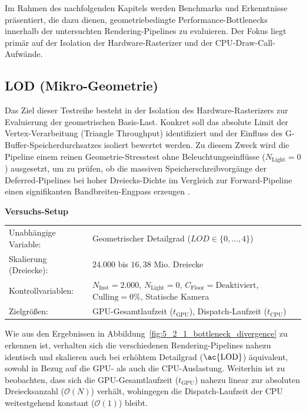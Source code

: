 Im Rahmen des nachfolgenden Kapitels werden Benchmarks und Erkenntnisse präsentiert, die dazu dienen, geometriebedingte
Performance-Bottlenecks innerhalb der untersuchten Rendering-Pipelines zu evaluieren.
Der Fokus liegt primär auf der Isolation der Hardware-Rasterizer und der \ac{CPU}-Draw-Call-Aufwände.

\subsection{{LOD (Mikro-Geometrie)}}
\label{subsec:050201_lod_eval}

Das Ziel dieser Testreihe besteht in der Isolation des Hardware-Rasterizers zur Evaluierung der geometrischen Basis-Last.
Konkret soll das absolute Limit der Vertex-Verarbeitung (Triangle Throughput) identifiziert und der Einfluss des
G-Buffer-Speicherdurchsatzes isoliert bewertet werden.
Zu diesem Zweck wird die Pipeline einem reinen Geometrie-Stresstest ohne Beleuchtungseinflüsse ($N_{\text{Light}} = 0$)
ausgesetzt, um zu prüfen, ob die massiven Speicherschreibvorgänge der Deferred-Pipelines bei hoher Dreiecks-Dichte im
Vergleich zur Forward-Pipeline einen signifikanten Bandbreiten-Engpass
erzeugen \cite[S.~55]{burnsVisibilityBufferCacheFriendly2013}.

\begin{center}
    \small
    \colorbox{gray!5}{\parbox{0.95\textwidth}{
        \centering
        \vspace{2mm}
        {\sffamily\bfseries Versuchs-Setup} \\[1.5ex]
        \begin{tabularx}{0.9\textwidth}{>{\sffamily}l X}
            Unabhängige Variable:    & Geometrischer Detailgrad ($LOD \in \{0, \dots, 4\}$) \\
            Skalierung (Dreiecke):   & $24.000$ bis $16{,}38\text{ Mio.}$ Dreiecke \\
            Kontrollvariablen:       & $N_{\text{Inst}} = 2.000$, $N_{\text{Light}} = 0$, $C_{\text{Floor}} =
            \text{Deaktiviert}$, $\text{Culling} = 0\%$, Statische Kamera \\
            Zielgrößen:              & \ac{GPU}-Gesamtlaufzeit ($t_{\text{GPU}}$), Dispatch-Laufzeit ($t_{\text{CPU}}$)
        \end{tabularx}
        \vspace{2mm}
    }}
\end{center}

Wie aus den Ergebnissen in Abbildung~\ref{fig:5_2_1_bottleneck_divergence} zu erkennen ist, verhalten sich die
verschiedenen Rendering-Pipelines nahezu identisch und skalieren auch bei erhöhtem Detailgrad ($\text{\ac{LOD}}$)
äquivalent, sowohl in Bezug auf die \ac{GPU}- als auch die \ac{CPU}-Auslastung.
Weiterhin ist zu beobachten, dass sich die \ac{GPU}-Gesamtlaufzeit ($t_{\text{GPU}}$) nahezu linear zur absoluten
Dreiecksanzahl ($\mathcal{O}(N)$) verhält, wohingegen die Dispatch-Laufzeit der \ac{CPU}
weitestgehend konstant ($\mathcal{O}(1)$) bleibt.

